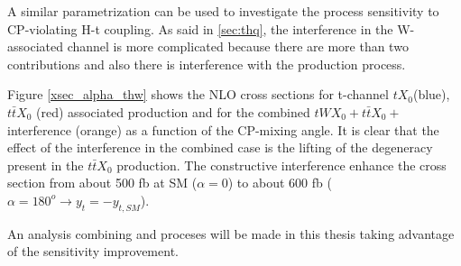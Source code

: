 \noindent A similar parametrization can be used to investigate the \tHW process sensitivity to CP-violating H-t coupling. As said in \ref{sec:thq}, the interference in the W-associated channel is more complicated because there are more than two contributions and also there is interference with the \ttH production process.

\noindent Figure \ref{xsec_alpha_thw} shows the NLO cross sections for t-channel $tX_0$(blue), $t\bar{t}X_0$ (red) associated production and for the combined  $tWX_0 + t\bar{t}X_0 +$ interference (orange) as a function of the CP-mixing angle. It is clear that the effect of the interference in the combined case is the lifting of the degeneracy present in the $t\bar{t}X_0$ production. The constructive interference enhance the cross section from about 500 fb at SM ($\alpha=0$) to about 600 fb ($\alpha=180^o \to y_t=-y_{t,SM}$).  

\noindent An analysis combining \tHq and \tHW proceses will be made in this thesis taking advantage of the sensitivity improvement.

